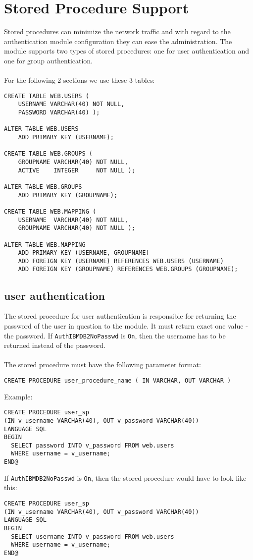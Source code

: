 \documentclass[11pt,letterpaper]{article}
\begin{document}
\begin{appendix}
\hypertarget{hsps}{}
\section{Stored Procedure Support} \label{sp}
Stored procedures can minimize the network traffic and with regard to the authentication module configuration they can ease the administration. The module supports two types of stored procedures: one for user authentication and one for group authentication.\\
\\
For the following 2 sections we use these 3 tables:
\\
\begin{verbatim}
CREATE TABLE WEB.USERS (
    USERNAME VARCHAR(40) NOT NULL,
    PASSWORD VARCHAR(40) );

ALTER TABLE WEB.USERS
    ADD PRIMARY KEY (USERNAME);

CREATE TABLE WEB.GROUPS (
    GROUPNAME VARCHAR(40) NOT NULL,
    ACTIVE    INTEGER     NOT NULL );

ALTER TABLE WEB.GROUPS
    ADD PRIMARY KEY (GROUPNAME);

CREATE TABLE WEB.MAPPING (
    USERNAME  VARCHAR(40) NOT NULL,
    GROUPNAME VARCHAR(40) NOT NULL );

ALTER TABLE WEB.MAPPING
    ADD PRIMARY KEY (USERNAME, GROUPNAME)
    ADD FOREIGN KEY (USERNAME) REFERENCES WEB.USERS (USERNAME)
    ADD FOREIGN KEY (GROUPNAME) REFERENCES WEB.GROUPS (GROUPNAME);
\end{verbatim}
\newpage
\hypertarget{husersp}{}
\subsection{user authentication} \label{usersp}
The stored procedure for user authentication is responsible for returning the password of the user in question to the module. It must return exact one value - the password. If {\tt AuthIBMDB2NoPasswd} is {\tt On}, then the username has to be returned instead of the password.\\
\\
The stored procedure must have the following parameter format:
\begin{verbatim}
CREATE PROCEDURE user_procedure_name ( IN VARCHAR, OUT VARCHAR )
\end{verbatim}
Example:
\begin{verbatim}
CREATE PROCEDURE user_sp
(IN v_username VARCHAR(40), OUT v_password VARCHAR(40))
LANGUAGE SQL
BEGIN
  SELECT password INTO v_password FROM web.users
  WHERE username = v_username;
END@
\end{verbatim}
If {\tt AuthIBMDB2NoPasswd} is {\tt On}, then the stored procedure would have to look like this:
\begin{verbatim}
CREATE PROCEDURE user_sp
(IN v_username VARCHAR(40), OUT v_password VARCHAR(40))
LANGUAGE SQL
BEGIN
  SELECT username INTO v_password FROM web.users
  WHERE username = v_username;
END@
\end{verbatim}
\newpage
\hypertarget{hgroupsp}{}

\end{appendix}
\end{document}
